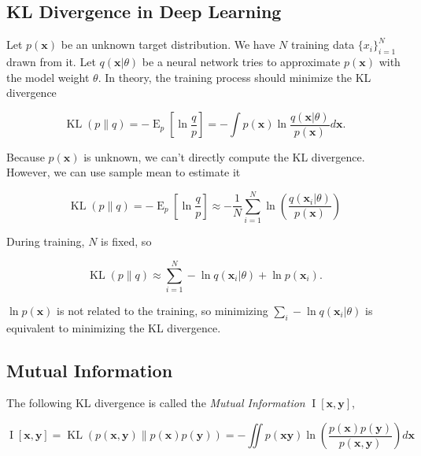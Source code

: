 \documentclass{article}
\begin{document}
        \subsection{KL Divergence in Deep Learning}

            Let $ p(\mathbf{x}) $ be an unknown target distribution. We have $
            N $ training data $ \{ x_{i} \}_{i=1}^{N} $ drawn from it. Let $
            q(\mathbf{x} | \theta) $ be a neural network tries to approximate $
            p(\mathbf{x}) $ with the model weight $ \theta $. In theory, the 
            training process should minimize the KL divergence

            \begin{equation*}
                 \operatorname{KL}(p \| q) = -\operatorname{E}_{p} \left[ \ln
                 \frac{q}{p} \right] = - \int p(\mathbf{x}) \ln
                 \frac{q(\mathbf{x} | \theta)}{p(\mathbf{x})} d \mathbf{x}.
            \end{equation*}
            
            Because $ p(\mathbf{x}) $ is unknown, we can't directly compute the
            KL divergence. However, we can use sample mean to estimate it

            \begin{equation*}
                 \operatorname{KL}(p \| q) = -\operatorname{E}_{p} \left[ \ln
                 \frac{q}{p} \right] \approx -\frac{1}{N} \sum_{i=1}^{N} \ln
                 \left( \frac{q(\mathbf{x}_{i} | \theta)}{p(\mathbf{x})} \right)
            \end{equation*}

            During training, $ N $ is fixed, so

            \begin{equation*}
                 \operatorname{KL}(p \| q) \approx \sum_{i=1}^{N} -\ln
                 q(\mathbf{x}_{i} | \theta) + \ln p(\mathbf{x}_{i}).
            \end{equation*}

            $ \ln p(\mathbf{x}) $ is not related to the training, so minimizing
            $ \sum_{i} -\ln q(\mathbf{x}_{i} | \theta) $ is equivalent to
            minimizing the KL divergence.

        \subsection{Mutual Information}

           The following KL divergence is called the \textit{Mutual
           Information} $ \operatorname{I}[\mathbf{x}, \mathbf{y}] $,

           \begin{equation*}
               \operatorname{I}[\mathbf{x}, \mathbf{y}] =
               \operatorname{KL}(p(\mathbf{x}, \mathbf{y}) \| p(\mathbf{x})
               p(\mathbf{y})) = - \iint p(\mathbf{x} \mathbf{y}) \ln  \left(
                   \frac{p(\mathbf{x}) p(\mathbf{y})}{p(\mathbf{x}, \mathbf{y})}
               \right) d \mathbf{x}
           \end{equation*}
\end{document}
